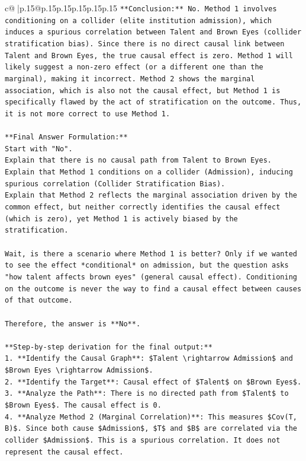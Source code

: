 \documentclass{article}
\begin{document}
{\begin{supertabular}{c@{$\;$}|p{.15\linewidth}@{}p{.15\linewidth}p{.15\linewidth}p{.15\linewidth}p{.15\linewidth}p{.15\linewidth}}
{{{\texttt{**Conclusion:** No. Method 1 involves conditioning on a collider (elite institution admission), which induces a spurious correlation between Talent and Brown Eyes (collider stratification bias). Since there is no direct causal link between Talent and Brown Eyes, the true causal effect is zero. Method 1 will likely suggest a non{-}zero effect (or a different one than the marginal), making it incorrect. Method 2 shows the marginal association, which is also not the causal effect, but Method 1 is specifically flawed by the act of stratification on the outcome. Thus, it is not more correct to use Method 1.} \\
\\ 
\texttt{**Final Answer Formulation:**} \\
\texttt{Start with "No".} \\
\texttt{Explain that there is no causal path from Talent to Brown Eyes.} \\
\texttt{Explain that Method 1 conditions on a collider (Admission), inducing spurious correlation (Collider Stratification Bias).} \\
\texttt{Explain that Method 2 reflects the marginal association driven by the common effect, but neither correctly identifies the causal effect (which is zero), yet Method 1 is actively biased by the stratification.} \\
\\ 
\texttt{Wait, is there a scenario where Method 1 is better? Only if we wanted to see the effect *conditional* on admission, but the question asks "how talent affects brown eyes" (general causal effect). Conditioning on the outcome is never the way to find a causal effect between causes of that outcome.} \\
\\ 
\texttt{Therefore, the answer is **No**.} \\
\\ 
\texttt{**Step{-}by{-}step derivation for the final output:**} \\
\texttt{1.  **Identify the Causal Graph**: \$Talent \textbackslash{}rightarrow Admission\$ and \$Brown Eyes \textbackslash{}rightarrow Admission\$.} \\
\texttt{2.  **Identify the Target**: Causal effect of \$Talent\$ on \$Brown Eyes\$.} \\
\texttt{3.  **Analyze the Path**: There is no directed path from \$Talent\$ to \$Brown Eyes\$. The causal effect is 0.} \\
\texttt{4.  **Analyze Method 2 (Marginal Correlation)**: This measures \$Cov(T, B)\$. Since both cause \$Admission\$, \$T\$ and \$B\$ are correlated via the collider \$Admission\$. This is a spurious correlation. It does not represent the causal effect.} \\
}}}
\end{supertabular}}
\end{document}
